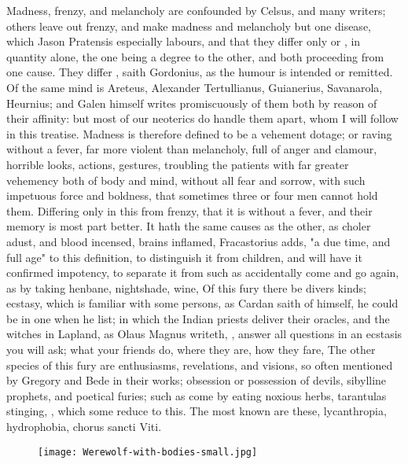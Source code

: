 Madness, frenzy, and melancholy are confounded by Celsus, and many writers;
others leave out frenzy, and make madness and melancholy but one disease, which
Jason Pratensis especially labours, and that they differ
only  or , in quantity alone, the one being a
degree to the other, and both proceeding from one cause. They differ
, saith Gordonius, as the
humour is intended or remitted. Of the same mind is
Areteus, Alexander Tertullianus, Guianerius, Savanarola,
Heurnius; and Galen himself writes promiscuously of them both by reason of
their affinity: but most of our neoterics do handle them apart, whom I will
follow in this treatise. Madness is therefore defined to be a vehement dotage;
or raving without a fever, far more violent than melancholy, full of anger and
clamour, horrible looks, actions, gestures, troubling the patients with far
greater vehemency both of body and mind, without all fear and sorrow, with such
impetuous force and boldness, that sometimes three or four men cannot hold
them. Differing only in this from frenzy, that it is without a fever, and their
memory is most part better. It hath the same causes as the other, as choler
adust, and blood incensed, brains inflamed, \etc{}
Fracastorius adds, "a due time, and full age" to this
definition, to distinguish it from children, and will have it confirmed
impotency, to separate it from such as accidentally come and go again, as by
taking henbane, nightshade, wine, \etc{} Of this fury there be divers kinds;
ecstasy, which is familiar with some persons, as Cardan
saith of himself, he could be in one when he list; in which the Indian priests
deliver their oracles, and the witches in Lapland, as Olaus Magnus writeth,
 , answer all
questions in an ecstasis you will ask; what your friends do, where they are,
how they fare, \etc{} The other species of this fury are enthusiasms,
revelations, and visions, so often mentioned by Gregory and Bede in their
works; obsession or possession of devils, sibylline prophets, and poetical
furies; such as come by eating noxious herbs, tarantulas stinging, \etc{},
which some reduce to this. The most known are these, lycanthropia, hydrophobia,
chorus sancti Viti.

\cleartoleftpage{}
\begin{figure}[p]
  \begingroup
  \centering
  \texttt{[image: Werewolf-with-bodies-small.jpg]}
  \label{fig:werewolf}
\end{figure}

